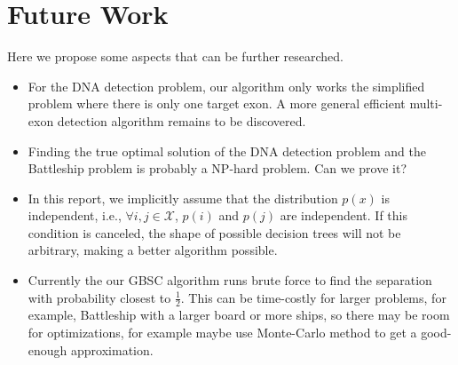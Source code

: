 \section{Future Work}

Here we propose some aspects that can be further researched.

\begin{itemize}
    \item For the DNA detection problem, our algorithm only works the simplified problem where there is only one target exon. A more general efficient multi-exon detection algorithm remains to be discovered.

    \item Finding the true optimal solution of the DNA detection problem and the Battleship problem is probably a NP-hard problem. Can we prove it?

    \item In this report, we implicitly assume that the distribution $p(x)$ is independent, i.e., $\forall i, j \in \mathcal{X}$, $p(i)$ and $p(j)$ are independent. If this condition is canceled, the shape of possible decision trees will not be arbitrary, making a better algorithm possible.
    
    \item Currently the our GBSC algorithm runs brute force to find the separation with probability closest to $\frac{1}{2}$. This can be time-costly for larger problems, for example, Battleship with a larger board or more ships, so there may be room for optimizations, for example maybe use Monte-Carlo method to get a good-enough approximation.
\end{itemize}
